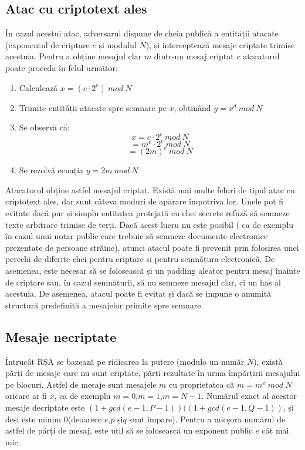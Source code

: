 \documentclass[12]{report}
\begin{document}
\subsection{Atac cu criptotext ales}
În cazul acestui atac, adversarul dispune de cheia publică a entității atacate (exponentul de criptare $e$ și modulul $N$), și interceptează mesaje criptate trimise acestuia. Pentru a obține mesajul clar $m$ dintr-un mesaj criptat $c$ atacatorul poate proceda în felul următor:
\begin{enumerate}
\item Calculează $x=(c \cdot   2^e) \ mod \ N$
\item Trimite entității atacate spre semnare pe $x$, obținând $y=x^d \ mod \ N$
\item Se observă că: 
$$x=c \cdot 2^e \ mod \ N $$
$$=m^e \cdot   2^e \ mod \ N$$
$$=(2m)^e \ mod \ N$$ 
\item Se rezolvă ecuația $y=2m \ mod \ N$
\end{enumerate}
Atacatorul obține astfel mesajul criptat. Există mai multe feluri de tipul atac cu criptotext ales, dar sunt câteva moduri de apărare împotriva lor. Unele pot fi evitate dacă pur și simplu entitatea protejată cu chei secrete refuză să semneze texte arbitrare trimise de terți. Dacă acest lucru nu este posibil ( ca de exemplu în cazul unui notar public care trebuie să semneze documente electronice prezentate de persoane străine), atunci atacul poate fi prevenit prin folosirea unei perechi de diferite chei pentru criptare și pentru semnătura electronică. De asemenea, este necesar să se folosească și un padding aleator pentru mesaj înainte de criptare sau, în cazul semnăturii, să nu semneze mesajul clar, ci un has al acestuia. De asemenea, atacul poate fi evitat și dacă se impune o anumită structură predefinită a mesajelor primite spre semnare.
\subsection{Mesaje necriptate}
Întrucât RSA se bazează pe ridicarea la putere (modulo un număr $N$), există părți de mesaje care nu sunt criptate, părți rezultate în urma împărțirii mesajului pe blocuri. Astfel de mesaje sunt mesajele $m$ cu proprietatea că $m=m^x \ mod \ N$ oricare ar fi $x$, ca de exemplu $m=0$,$m=1$,$m=N-1$. Numărul exact al acestor mesaje decriptate este $(1+gcd(e-1,P-1))((1+gcd(e-1,Q-1))$, și deși este minim 0(deoarece $e$,$p$ și$q$ sunt impare). Pentru a micșora numărul de astfel de părți de mesaj, este util să se folosească un exponent public $e$ cât mai mic.
\end{document}
